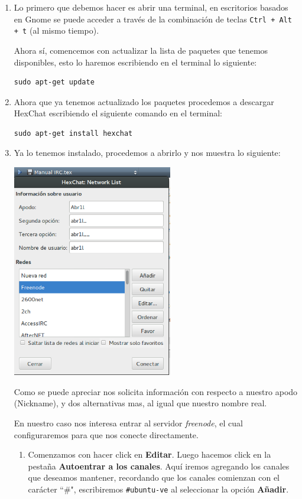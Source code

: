 \documentclass[12pt,letterpaper]{article}
\begin{document}
\begin{enumerate}
\item Lo primero que debemos hacer es abrir una terminal, en escritorios basados en Gnome se puede acceder a trav\'es  de la combinaci\'on de teclas \verb!Ctrl + Alt + t! (al mismo tiempo). 

Ahora sí, comencemos con actualizar la lista de paquetes que tenemos disponibles, esto lo haremos escribiendo en el terminal lo siguiente:

\begin{verbatim}
sudo apt-get update
\end{verbatim}

\item Ahora que ya tenemos actualizado los paquetes procedemos a descargar HexChat escribiendo el siguiente comando en el terminal:

\begin{verbatim}
sudo apt-get install hexchat
\end{verbatim}

\item Ya lo tenemos instalado, procedemos a abrirlo y nos muestra lo siguiente:

\includegraphics[width = 7cm]{imagenes/imagen1.png}

Como se puede apreciar nos solicita información con respecto a nuestro apodo (Nickname), y dos alternativas mas, al igual que nuestro nombre real.

En nuestro caso nos interesa entrar al servidor \textit{freenode}, el cual configuraremos para que nos conecte directamente.

\begin{enumerate}
\item Comenzamos con hacer click en \textbf{Editar}. Luego hacemos click en la pestaña \textbf{Autoentrar a los canales}. Aquí iremos agregando los canales que deseamos mantener, recordando que los canales comienzan con el carácter ``\#", escribiremos \texttt{\#ubuntu-ve} al seleccionar la opci\'on \textbf{A\~nadir}.


\end{enumerate}
\end{enumerate}
\end{document}
